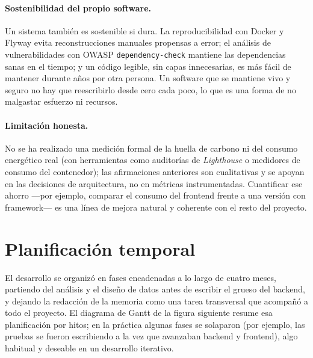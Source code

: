 \documentclass[12pt,a4paper]{report}
\begin{document}
\paragraph{Sostenibilidad del propio software.} Un sistema también es sostenible si dura. La reproducibilidad con Docker y Flyway evita reconstrucciones manuales propensas a error; el análisis de vulnerabilidades con OWASP \texttt{dependency-check} mantiene las dependencias sanas en el tiempo; y un código legible, sin capas innecesarias, es más fácil de mantener durante años por otra persona. Un software que se mantiene vivo y seguro no hay que reescribirlo desde cero cada poco, lo que es una forma de no malgastar esfuerzo ni recursos.

\paragraph{Limitación honesta.} No se ha realizado una medición formal de la huella de carbono ni del consumo energético real (con herramientas como auditorías de \emph{Lighthouse} o medidores de consumo del contenedor); las afirmaciones anteriores son cualitativas y se apoyan en las decisiones de arquitectura, no en métricas instrumentadas. Cuantificar ese ahorro —por ejemplo, comparar el consumo del frontend frente a una versión con framework— es una línea de mejora natural y coherente con el resto del proyecto.

\section{Planificación temporal}

El desarrollo se organizó en fases encadenadas a lo largo de cuatro meses, partiendo del análisis y el diseño de datos antes de escribir el grueso del backend, y dejando la redacción de la memoria como una tarea transversal que acompañó a todo el proyecto. El diagrama de Gantt de la figura siguiente resume esa planificación por hitos; en la práctica algunas fases se solaparon (por ejemplo, las pruebas se fueron escribiendo a la vez que avanzaban backend y frontend), algo habitual y deseable en un desarrollo iterativo.
\end{document}
